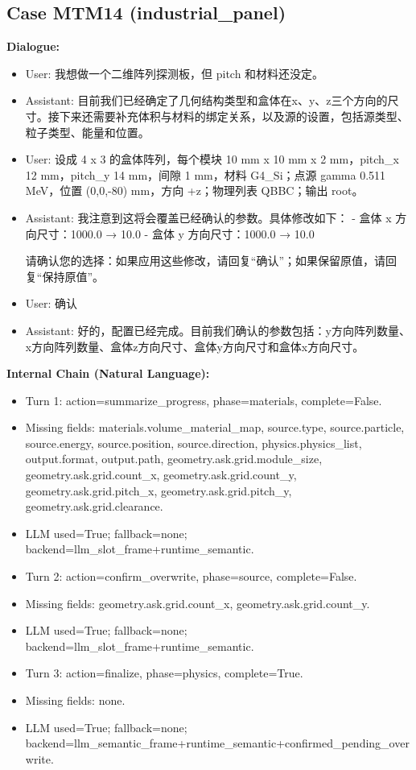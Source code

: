 \documentclass[11pt]{ctexart}
\begin{document}
\subsection{Case MTM14 (industrial\_panel)}
\textbf{Dialogue:}
\begin{itemize}
\item User: 我想做一个二维阵列探测板，但 pitch 和材料还没定。
\item Assistant: 目前我们已经确定了几何结构类型和盒体在x、y、z三个方向的尺寸。接下来还需要补充体积与材料的绑定关系，以及源的设置，包括源类型、粒子类型、能量和位置。
\item User: 设成 4 x 3 的盒体阵列，每个模块 10 mm x 10 mm x 2 mm，pitch\_x 12 mm，pitch\_y 14 mm，间隙 1 mm，材料 G4\_Si；点源 gamma 0.511 MeV，位置 (0,0,-80) mm，方向 +z；物理列表 QBBC；输出 root。
\item Assistant: 我注意到这将会覆盖已经确认的参数。具体修改如下：
- 盒体 x 方向尺寸：1000.0 → 10.0
- 盒体 y 方向尺寸：1000.0 → 10.0

请确认您的选择：如果应用这些修改，请回复“确认”；如果保留原值，请回复“保持原值”。
\item User: 确认
\item Assistant: 好的，配置已经完成。目前我们确认的参数包括：y方向阵列数量、x方向阵列数量、盒体z方向尺寸、盒体y方向尺寸和盒体x方向尺寸。
\end{itemize}
\textbf{Internal Chain (Natural Language):}
\begin{itemize}
\item Turn 1: action=summarize\_progress, phase=materials, complete=False.
\item Missing fields: materials.volume\_material\_map, source.type, source.particle, source.energy, source.position, source.direction, physics.physics\_list, output.format, output.path, geometry.ask.grid.module\_size, geometry.ask.grid.count\_x, geometry.ask.grid.count\_y, geometry.ask.grid.pitch\_x, geometry.ask.grid.pitch\_y, geometry.ask.grid.clearance.
\item LLM used=True; fallback=none; backend=llm\_slot\_frame+runtime\_semantic.
\item Turn 2: action=confirm\_overwrite, phase=source, complete=False.
\item Missing fields: geometry.ask.grid.count\_x, geometry.ask.grid.count\_y.
\item LLM used=True; fallback=none; backend=llm\_slot\_frame+runtime\_semantic.
\item Turn 3: action=finalize, phase=physics, complete=True.
\item Missing fields: none.
\item LLM used=True; fallback=none; backend=llm\_semantic\_frame+runtime\_semantic+confirmed\_pending\_overwrite.
\end{itemize}
\end{document}
